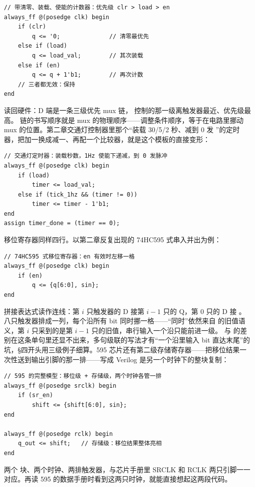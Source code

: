 \begin{lstlisting}
// 带清零、装载、使能的计数器：优先级 clr > load > en
always_ff @(posedge clk) begin
    if (clr)
        q <= '0;              // 清零最优先
    else if (load)
        q <= load_val;        // 其次装载
    else if (en)
        q <= q + 1'b1;        // 再次计数
    // 三者都无效：保持
end
\end{lstlisting}

读回硬件：D 端是一条三级优先 mux 链， 控制的那一级离触发器最近、优先级最高。 链的书写顺序就是 mux 的物理顺序——调整条件顺序，等于在电路里挪动 mux 的位置。第二章交通灯控制器里那个“装载 30/5/2 秒、减到 0 发 ”的定时器，把加一换成减一、再配一个比较器，就是这个模板的直接变形：

\begin{lstlisting}
// 交通灯定时器：装载秒数，1Hz 使能下递减，到 0 发脉冲
always_ff @(posedge clk) begin
    if (load)
        timer <= load_val;
    else if (tick_1hz && (timer != 0))
        timer <= timer - 1'b1;
end
assign timer_done = (timer == 0);
\end{lstlisting}

移位寄存器同样四行。以第二章反复出现的 74HC595 式串入并出为例：

\begin{lstlisting}
// 74HC595 式移位寄存器：en 有效时左移一格
always_ff @(posedge clk) begin
    if (en)
        q <= {q[6:0], sin};
end
\end{lstlisting}

拼接表达式读作连线：第 $i$ 只触发器的 D 接第 $i-1$ 只的 Q，第 0 只的 D 接 。八只触发器排成一列，每个沿所有 bit 同时挪一格——“同时”依然来自 \code{<=} 的旧值语义，第 $i$ 只采到的是第 $i-1$ 只的旧值，串行输入一个沿只能前进一级。\code{<=} 与 \code{=} 的差别在这条单句里还显不出来，多句级联的写法才有“一个沿里输入 bit 直达末尾”的坑，§四开头用三级例子细算。595 芯片还有第二级存储寄存器——把移位结果一次性送到输出引脚的那一排——写成 Verilog 是另一个时钟下的整块复制：

\begin{lstlisting}
// 595 的完整模型：移位级 + 存储级，两个时钟各管一排
always_ff @(posedge srclk) begin
    if (sr_en)
        shift <= {shift[6:0], sin};
end

always_ff @(posedge rclk) begin
    q_out <= shift;   // 存储级：移位结果整体亮相
end
\end{lstlisting}

两个  块、两个时钟、两排触发器，与芯片手册里 SRCLK 和 RCLK 两只引脚一一对应。再读 595 的数据手册时看到这两只时钟，就能直接想起这两段代码。

